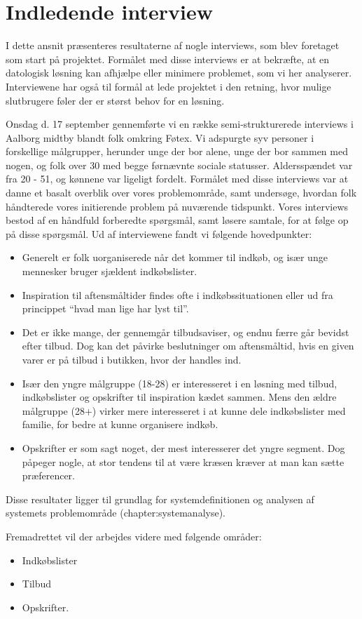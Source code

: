 \section{Indledende interview}\label{section:interview1}
I dette ansnit præsenteres resultaterne af nogle interviews, som blev foretaget som start på projektet.
Formålet med disse interviews er at bekræfte, at en datologisk løsning kan afhjælpe eller minimere problemet, som vi her analyserer.
Interviewene har også til formål at lede projektet i den retning, hvor mulige slutbrugere føler der er størst behov for en løsning.


Onsdag d. 17 september gennemførte vi en række semi-strukturerede interviews i Aalborg midtby blandt folk omkring Føtex.
Vi adspurgte syv personer i forskellige målgrupper, herunder unge der bor alene, unge der bor sammen med nogen, og  folk over 30 med begge førnævnte sociale statusser.
Aldersspændet var fra 20 - 51, og kønnene var ligeligt fordelt.
Formålet med disse interviews var at danne et basalt overblik over vores problemområde, samt undersøge, hvordan folk håndterede vores initierende problem på nuværende tidspunkt.
Vores interviews bestod af en håndfuld forberedte spørgsmål, samt løsere samtale, for at følge op på disse spørgsmål.
Ud af interviewene fandt vi følgende hovedpunkter:
\begin{itemize}
	\item Generelt er folk uorganiserede når det kommer til indkøb, og især unge mennesker bruger sjældent indkøbslister.
	\item Inspiration til aftensmåltider findes ofte i indkøbssituationen eller ud fra princippet “hvad man lige har lyst til”.
	\item Det er ikke mange, der gennemgår tilbudsaviser, og endnu færre går bevidst efter tilbud.
	Dog kan det påvirke beslutninger om aftensmåltid, hvis en given varer er på tilbud i butikken, hvor der handles ind.
	\item Især den yngre målgruppe (18-28) er interesseret i en løsning med tilbud, indkøbslister og opskrifter til inspiration kædet sammen. Mens den ældre målgruppe (28+) virker mere interesseret i at kunne dele indkøbslister med familie, for bedre at kunne organisere indkøb.
	\item Opskrifter er som sagt noget, der mest interesserer det yngre segment.
	Dog påpeger nogle, at stor tendens til at være kræsen kræver at man kan sætte præferencer.
\end{itemize}

Disse resultater ligger til grundlag for systemdefinitionen og analysen af systemets problemområde \myref(chapter:systemanalyse).

Fremadrettet vil der arbejdes videre med følgende områder:

\begin{itemize}
	\item Indkøbslister
	\item Tilbud
	\item Opskrifter.
\end{itemize}
